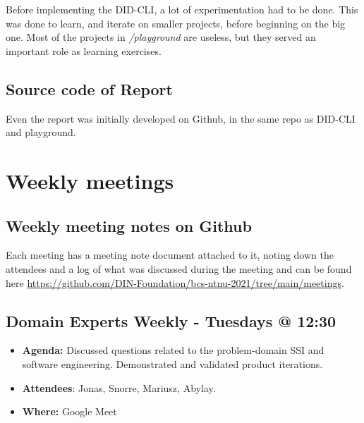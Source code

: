 Before implementing the DID-CLI, a lot of experimentation had to be
done. This was done to learn, and iterate on smaller projects, before
beginning on the big one. Most of the projects in \textit{/playground}
are useless, but they served an important role as learning exercises.


\hypertarget{source-code-of-report}{%
\subsection{Source code of Report}\label{source-code-of-report}}

Even the report was initially developed on Github, in the same repo as
DID-CLI and playground.


\hypertarget{weekly-meetings}{%
\section{Weekly meetings}\label{weekly-meetings}}

\hypertarget{weekly-meeting-notes-on-github}{%
\subsection{Weekly meeting notes on
Github}\label{weekly-meeting-notes-on-github}}

Each meeting has a meeting note document attached to it, noting down the
attendees and a log of what was discussed during the meeting and can be
found here
\url{https://github.com/DIN-Foundation/bcs-ntnu-2021/tree/main/meetings}.




\pagebreak



\hypertarget{domain-experts-weekly---tuesdays-1230}{%
\subsection{Domain Experts Weekly - Tuesdays @
12:30}\label{domain-experts-weekly---tuesdays-1230}}

\begin{itemize}
\tightlist
\item
  \textbf{Agenda:} Discussed questions related to the problem-domain SSI
  and software engineering. Demonstrated and validated product
  iterations.
\item
  \textbf{Attendees}: Jonas, Snorre, Mariusz, Abylay.
\item
  \textbf{Where:} Google Meet
\end{itemize}

